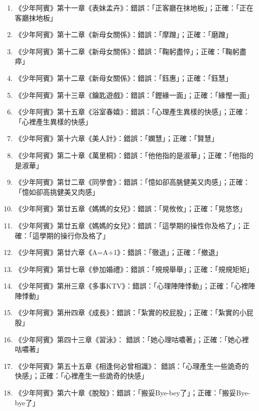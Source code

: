 \begin{enumerate}
\item 《少年阿賓》第十一章《表妹孟卉》：錯誤：「正客廳在抹地板」；正確：「正在客廳抹地板」
\item 《少年阿賓》第十二章《新母女關係》：錯誤：「摩蹭」；正確：「磨蹭」
\item 《少年阿賓》第十二章《新母女關係》：錯誤：「鞠躬盡悴」；正確：「鞠躬盡瘁」
\item 《少年阿賓》第十二章《新母女關係》：錯誤：「鈺惠」；正確：「鈺慧」
\item 《少年阿賓》第十三章《鑰匙遊戲》：錯誤：「鏗緣一面」；正確：「緣慳一面」
\item 《少年阿賓》第十五章《浴室春嬉》：錯誤：「心理產生異樣的快感」；正確：「心裡產生異樣的快感」
\item 《少年阿賓》第十六章《美人計》：錯誤：「嫻慧」；正確：「賢慧」
\item 《少年阿賓》第二十章《萬里桐》：錯誤：「他他指的是淑華」；正確：「他指的是淑華」
\item 《少年阿賓》第廿二章《同學會》：錯誤：「憶如卻高朓健美又肉感」；正確：「憶如卻高挑健美又肉感」
\item 《少年阿賓》第廿五章《媽媽的女兒》：錯誤：「晃攸攸」；正確：「晃悠悠」
\item 《少年阿賓》第廿五章《媽媽的女兒》：錯誤：「這學期的操性你及格了」；正確：「這學期的操行你及格了」
\item 《少年阿賓》第廿六章《A=A+1》：錯誤：「徹退」；正確：「撤退」
\item 《少年阿賓》第廿七章《參加婚禮》：錯誤：「規規舉舉」；正確：「規規矩矩」
\item 《少年阿賓》第卅三章《多事KTV》：錯誤：「心理陣陣悸動」；正確：「心裡陣陣悸動」
\item 《少年阿賓》第卅四章《成長》：錯誤：「紮實的校屁股」；正確：「紮實的小屁股」
\item 《少年阿賓》第四十三章《習泳》： 錯誤：「她心理咕噥著」；正確：「她心裡咕噥著」
\item 《少年阿賓》第五十五章《相逢何必曾相識》： 錯誤：「心理產生一些詭奇的快感」；正確：「心裡產生一些詭奇的快感」
\item 《少年阿賓》第六十章《脫殼》：錯誤：「搬妥Bye-bey了」；正確：「搬妥Bye-bye了」
\end{enumerate}
